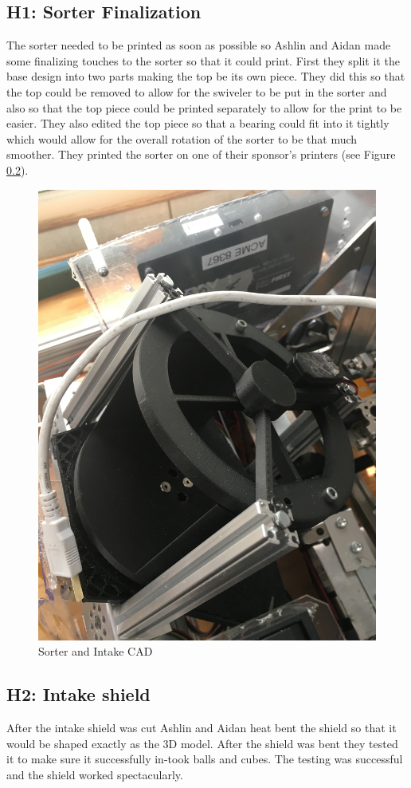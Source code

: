 \documentclass{article}
\begin{document}
\subsection{H1: Sorter Finalization}

The sorter needed to be printed as soon as possible so Ashlin and Aidan made some finalizing touches to the sorter so that it could print. First they split it the base design into two parts making the top be its own piece. They did this so that the top could be removed to allow for the swiveler to be put in the sorter and also so that the top piece could be printed separately to allow for the print to be easier. They also edited the top piece so that a bearing could fit into it tightly which would allow for the overall rotation of the sorter to be that much smoother. They printed the sorter on one of their sponsor's printers (see Figure \ref{}).

\begin{figure}
    \centering
    \includegraphics[width=.6 \textwidth, angle=270 ]{10_11-05/images/sorter.JPG}
    \caption{Sorter and Intake CAD}
    \label{fig:Intake CAD}
\end{figure}

\subsection{H2: Intake shield}

After the intake shield was cut Ashlin and Aidan heat bent the shield so that it would be shaped exactly as the 3D model. After the shield was bent they tested it to make sure it successfully in-took balls and cubes. The testing was successful and the shield worked  spectacularly.
\end{document}
